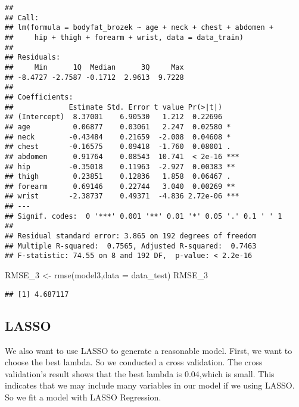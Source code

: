 \documentclass[
]{article}
\newenvironment{Shaded}{\begin{snugshade}}{\end{snugshade}}
\newcommand{\AttributeTok}[1]{\textcolor[rgb]{0.77,0.63,0.00}{#1}}
\newcommand{\FunctionTok}[1]{\textcolor[rgb]{0.00,0.00,0.00}{#1}}
\newcommand{\NormalTok}[1]{#1}
\newcommand{\OtherTok}[1]{\textcolor[rgb]{0.56,0.35,0.01}{#1}}
\begin{document}
\begin{verbatim}
## 
## Call:
## lm(formula = bodyfat_brozek ~ age + neck + chest + abdomen + 
##     hip + thigh + forearm + wrist, data = data_train)
## 
## Residuals:
##     Min      1Q  Median      3Q     Max 
## -8.4727 -2.7587 -0.1712  2.9613  9.7228 
## 
## Coefficients:
##             Estimate Std. Error t value Pr(>|t|)    
## (Intercept)  8.37001    6.90530   1.212  0.22696    
## age          0.06877    0.03061   2.247  0.02580 *  
## neck        -0.43484    0.21659  -2.008  0.04608 *  
## chest       -0.16575    0.09418  -1.760  0.08001 .  
## abdomen      0.91764    0.08543  10.741  < 2e-16 ***
## hip         -0.35018    0.11963  -2.927  0.00383 ** 
## thigh        0.23851    0.12836   1.858  0.06467 .  
## forearm      0.69146    0.22744   3.040  0.00269 ** 
## wrist       -2.38737    0.49371  -4.836 2.72e-06 ***
## ---
## Signif. codes:  0 '***' 0.001 '**' 0.01 '*' 0.05 '.' 0.1 ' ' 1
## 
## Residual standard error: 3.865 on 192 degrees of freedom
## Multiple R-squared:  0.7565, Adjusted R-squared:  0.7463 
## F-statistic: 74.55 on 8 and 192 DF,  p-value: < 2.2e-16
\end{verbatim}

\begin{Shaded}
\begin{Highlighting}[]
\NormalTok{RMSE\_3 }\OtherTok{\textless{}{-}} \FunctionTok{rmse}\NormalTok{(model3,}\AttributeTok{data =}\NormalTok{ data\_test)}
\NormalTok{RMSE\_3}
\end{Highlighting}
\end{Shaded}

\begin{verbatim}
## [1] 4.687117
\end{verbatim}

\hypertarget{lasso}{%
\subsection{LASSO}\label{lasso}}

We also want to use LASSO to generate a reasonable model. First, we want
to choose the best lambda. So we conducted a cross validation. The cross
validation's result shows that the best lambda is 0.04,which is small.
This indicates that we may include many variables in our model if we
using LASSO. So we fit a model with LASSO Regression.
\end{document}
